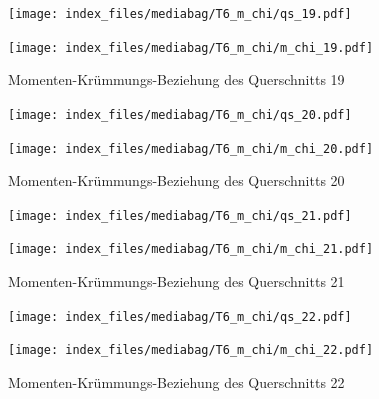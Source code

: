 \documentclass[
  11pt,
  letterpaper,
]{scrreprt}
\begin{document}
\begin{figure}[H]

\begin{minipage}{0.50\linewidth}
\texttt{[image: index\_files/mediabag/T6\_m\_chi/qs\_19.pdf]}\end{minipage}%
%
\begin{minipage}{0.50\linewidth}
\texttt{[image: index\_files/mediabag/T6\_m\_chi/m\_chi\_19.pdf]}\end{minipage}%

\caption{\label{fig-m_chi_appendix}Momenten-Krümmungs-Beziehung des
Querschnitts 19}

\end{figure}%

\begin{figure}[H]

\begin{minipage}{0.50\linewidth}
\texttt{[image: index\_files/mediabag/T6\_m\_chi/qs\_20.pdf]}\end{minipage}%
%
\begin{minipage}{0.50\linewidth}
\texttt{[image: index\_files/mediabag/T6\_m\_chi/m\_chi\_20.pdf]}\end{minipage}%

\caption{\label{fig-m_chi_appendix}Momenten-Krümmungs-Beziehung des
Querschnitts 20}

\end{figure}%

\begin{figure}[H]

\begin{minipage}{0.50\linewidth}
\texttt{[image: index\_files/mediabag/T6\_m\_chi/qs\_21.pdf]}\end{minipage}%
%
\begin{minipage}{0.50\linewidth}
\texttt{[image: index\_files/mediabag/T6\_m\_chi/m\_chi\_21.pdf]}\end{minipage}%

\caption{\label{fig-m_chi_appendix}Momenten-Krümmungs-Beziehung des
Querschnitts 21}

\end{figure}%

\begin{figure}[H]

\begin{minipage}{0.50\linewidth}
\texttt{[image: index\_files/mediabag/T6\_m\_chi/qs\_22.pdf]}\end{minipage}%
%
\begin{minipage}{0.50\linewidth}
\texttt{[image: index\_files/mediabag/T6\_m\_chi/m\_chi\_22.pdf]}\end{minipage}%

\caption{\label{fig-m_chi_appendix}Momenten-Krümmungs-Beziehung des
Querschnitts 22}

\end{figure}%
\end{document}
